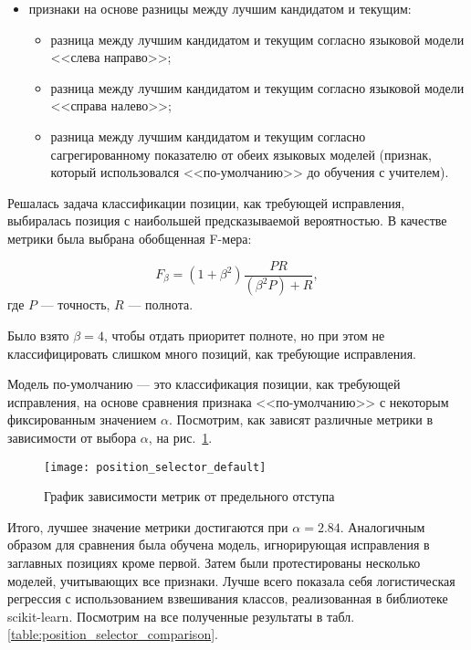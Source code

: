 \begin{itemize}
\begin{itemize}
	\end{itemize}
	\item признаки на основе разницы между лучшим кандидатом и текущим:
	\begin{itemize}
		\item разница между лучшим кандидатом и текущим согласно языковой модели <<слева направо>>;
		\item разница между лучшим кандидатом и текущим согласно языковой модели <<справа налево>>;
		\item разница между лучшим кандидатом и текущим согласно сагрегированному показателю от обеих языковых моделей (признак, который использовался <<по-умолчанию>> до обучения с учителем).
	\end{itemize}
\end{itemize}

Решалась задача классификации позиции, как требующей исправления, выбиралась позиция с наибольшей предсказываемой вероятностью. В качестве метрики была выбрана обобщенная F-мера:

\begin{equation*}
	F_{\beta} = (1 + \beta^2) \frac{PR}{(\beta^2 P) + R},
\end{equation*}
где $P$ --- точность, $R$ --- полнота.

Было взято $\beta = 4$, чтобы отдать приоритет полноте, но при этом не классифицировать слишком много позиций, как требующие исправления.

Модель по-умолчанию --- это классификация позиции, как требующей исправления, на основе сравнения признака <<по-умолчанию>> с некоторым фиксированным значением $\alpha$. Посмотрим, как зависят различные метрики в зависимости от выбора $\alpha$, на рис.~\ref{ris:f4_plot_default}.

\begin{center}
	\begin{figure}[h!]
		\texttt{[image: position\_selector\_default]}
		\caption{График зависимости метрик от предельного отступа}
		\label{ris:f4_plot_default}
	\end{figure}
\end{center}

Итого, лучшее значение метрики достигаются при $\alpha = 2.84$. Аналогичным образом для сравнения была обучена  модель, игнорирующая исправления в заглавных позициях кроме первой. Затем были протестированы несколько моделей, учитывающих все признаки. Лучше всего показала себя логистическая регрессия с использованием взвешивания классов, реализованная в библиотеке scikit-learn. Посмотрим на все полученные результаты в табл.~ \ref{table:position_selector_comparison}.

